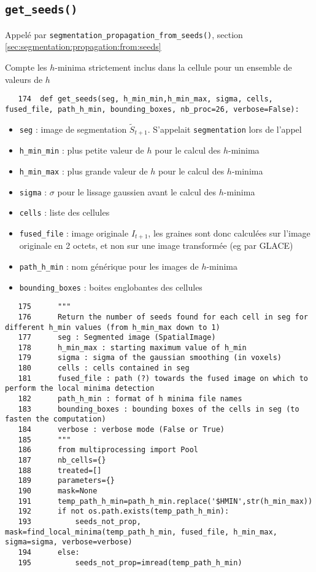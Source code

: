 \documentclass{article}
\def \mycolor {red}
\begin{document}
\subsection{\texttt{get\_seeds()}}
\label{sec:get:seeds}
\color{\mycolor}
Appel\'e par \texttt{segmentation\_propagation\_from\_seeds()},
section \ref{sec:segmentation:propagation:from:seeds}

Compte les $h$-minima strictement inclus dans la cellule pour un ensemble de valeurs de $h$
\color{black}
\begin{verbatim}
   174	def get_seeds(seg, h_min_min,h_min_max, sigma, cells, fused_file, path_h_min, bounding_boxes, nb_proc=26, verbose=False):
\end{verbatim} 
\color{\mycolor}
\begin{itemize}
\itemsep -0.5ex
\item \verb|seg| : image de segmentation $\tilde{S}_{t+1}$. S'appelait \verb|segmentation| lors de l'appel
\item \verb|h_min_min| : plus petite valeur de $h$ pour le calcul des $h$-minima
\item \verb|h_min_max| : plus grande valeur de $h$ pour le calcul des $h$-minima
\item \verb|sigma| : $\sigma$ pour le lissage gaussien avant le calcul des $h$-minima
\item \verb|cells| : liste des cellules
\item \verb|fused_file| : image originale $I_{t+1}$, les graines sont donc calcul\'ees sur l'image originale en 2 octets, et non sur une image transform\'ee (eg par GLACE)
\item \verb|path_h_min| : nom g\'en\'erique pour les images de $h$-minima
\item \verb|bounding_boxes| : boites englobantes des cellules
\end{itemize}
\color{black}
\begin{verbatim}  
   175	    """
   176	    Return the number of seeds found for each cell in seg for different h_min values (from h_min_max down to 1)
   177	    seg : Segmented image (SpatialImage)
   178	    h_min_max : starting maximum value of h_min
   179	    sigma : sigma of the gaussian smoothing (in voxels)
   180	    cells : cells contained in seg
   181	    fused_file : path (?) towards the fused image on which to perform the local minima detection
   182	    path_h_min : format of h minima file names
   183	    bounding_boxes : bounding boxes of the cells in seg (to fasten the computation)
   184	    verbose : verbose mode (False or True)
   185	    """
   186	    from multiprocessing import Pool
   187	    nb_cells={}
   188	    treated=[]
   189	    parameters={}
   190	    mask=None
   191	    temp_path_h_min=path_h_min.replace('$HMIN',str(h_min_max))
   192	    if not os.path.exists(temp_path_h_min):
   193	        seeds_not_prop, mask=find_local_minima(temp_path_h_min, fused_file, h_min_max, sigma=sigma, verbose=verbose)
   194	    else:
   195	        seeds_not_prop=imread(temp_path_h_min)
\end{verbatim} 
\end{document}
